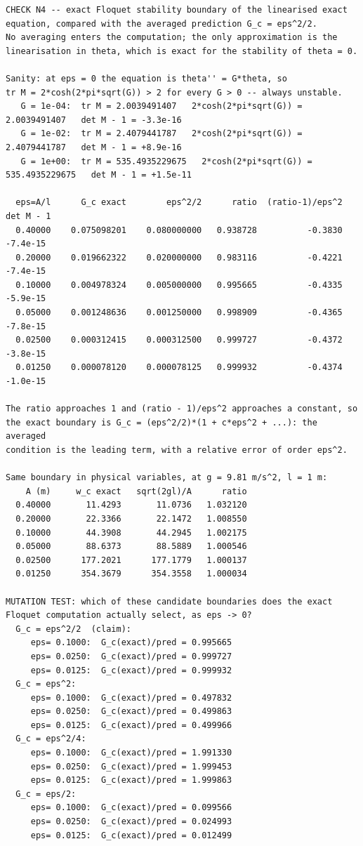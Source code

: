 \documentclass[11pt,a4paper]{article}
\begin{document}
\begin{lstlisting}
CHECK N4 -- exact Floquet stability boundary of the linearised exact
equation, compared with the averaged prediction G_c = eps^2/2.
No averaging enters the computation; the only approximation is the
linearisation in theta, which is exact for the stability of theta = 0.

Sanity: at eps = 0 the equation is theta'' = G*theta, so
tr M = 2*cosh(2*pi*sqrt(G)) > 2 for every G > 0 -- always unstable.
   G = 1e-04:  tr M = 2.0039491407   2*cosh(2*pi*sqrt(G)) = 2.0039491407   det M - 1 = -3.3e-16
   G = 1e-02:  tr M = 2.4079441787   2*cosh(2*pi*sqrt(G)) = 2.4079441787   det M - 1 = +8.9e-16
   G = 1e+00:  tr M = 535.4935229675   2*cosh(2*pi*sqrt(G)) = 535.4935229675   det M - 1 = +1.5e-11

  eps=A/l      G_c exact        eps^2/2      ratio  (ratio-1)/eps^2   det M - 1
  0.40000    0.075098201    0.080000000   0.938728          -0.3830    -7.4e-15
  0.20000    0.019662322    0.020000000   0.983116          -0.4221    -7.4e-15
  0.10000    0.004978324    0.005000000   0.995665          -0.4335    -5.9e-15
  0.05000    0.001248636    0.001250000   0.998909          -0.4365    -7.8e-15
  0.02500    0.000312415    0.000312500   0.999727          -0.4372    -3.8e-15
  0.01250    0.000078120    0.000078125   0.999932          -0.4374    -1.0e-15

The ratio approaches 1 and (ratio - 1)/eps^2 approaches a constant, so
the exact boundary is G_c = (eps^2/2)*(1 + c*eps^2 + ...): the averaged
condition is the leading term, with a relative error of order eps^2.

Same boundary in physical variables, at g = 9.81 m/s^2, l = 1 m:
    A (m)     w_c exact   sqrt(2gl)/A      ratio
  0.40000       11.4293       11.0736   1.032120
  0.20000       22.3366       22.1472   1.008550
  0.10000       44.3908       44.2945   1.002175
  0.05000       88.6373       88.5889   1.000546
  0.02500      177.2021      177.1779   1.000137
  0.01250      354.3679      354.3558   1.000034

MUTATION TEST: which of these candidate boundaries does the exact
Floquet computation actually select, as eps -> 0?
  G_c = eps^2/2  (claim):
     eps= 0.1000:  G_c(exact)/pred = 0.995665
     eps= 0.0250:  G_c(exact)/pred = 0.999727
     eps= 0.0125:  G_c(exact)/pred = 0.999932
  G_c = eps^2:
     eps= 0.1000:  G_c(exact)/pred = 0.497832
     eps= 0.0250:  G_c(exact)/pred = 0.499863
     eps= 0.0125:  G_c(exact)/pred = 0.499966
  G_c = eps^2/4:
     eps= 0.1000:  G_c(exact)/pred = 1.991330
     eps= 0.0250:  G_c(exact)/pred = 1.999453
     eps= 0.0125:  G_c(exact)/pred = 1.999863
  G_c = eps/2:
     eps= 0.1000:  G_c(exact)/pred = 0.099566
     eps= 0.0250:  G_c(exact)/pred = 0.024993
     eps= 0.0125:  G_c(exact)/pred = 0.012499
\end{lstlisting}
\end{document}
